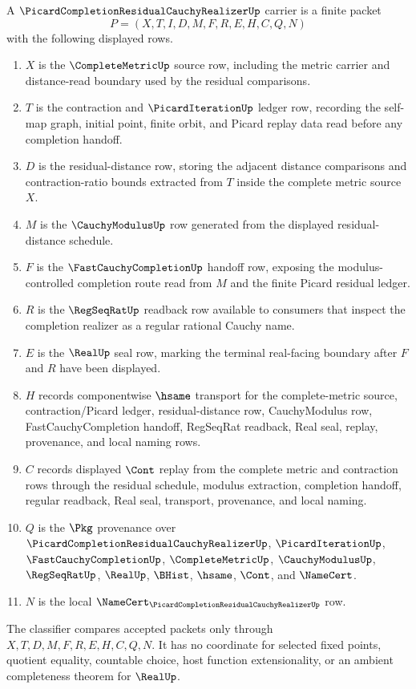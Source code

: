 \begin{definition}
\label{def:picard-completion-residual-cauchy-realizer}
A $\PicardCompletionResidualCauchyRealizerUp$ carrier is a finite packet
$$
P=(X,T,I,D,M,F,R,E,H,C,Q,N)
$$
with the following displayed rows.
\begin{enumerate}
\item $X$ is the $\CompleteMetricUp$ source row, including the metric carrier and distance-read boundary used by the residual comparisons.
\item $T$ is the contraction and $\PicardIterationUp$ ledger row, recording the self-map graph, initial point, finite orbit, and Picard replay data read before any completion handoff.
\item $D$ is the residual-distance row, storing the adjacent distance comparisons and contraction-ratio bounds extracted from $T$ inside the complete metric source $X$.
\item $M$ is the $\CauchyModulusUp$ row generated from the displayed residual-distance schedule.
\item $F$ is the $\FastCauchyCompletionUp$ handoff row, exposing the modulus-controlled completion route read from $M$ and the finite Picard residual ledger.
\item $R$ is the $\RegSeqRatUp$ readback row available to consumers that inspect the completion realizer as a regular rational Cauchy name.
\item $E$ is the $\RealUp$ seal row, marking the terminal real-facing boundary after $F$ and $R$ have been displayed.
\item $H$ records componentwise $\hsame$ transport for the complete-metric source, contraction/Picard ledger, residual-distance row, CauchyModulus row, FastCauchyCompletion handoff, RegSeqRat readback, Real seal, replay, provenance, and local naming rows.
\item $C$ records displayed $\Cont$ replay from the complete metric and contraction rows through the residual schedule, modulus extraction, completion handoff, regular readback, Real seal, transport, provenance, and local naming.
\item $Q$ is the $\Pkg$ provenance over $\PicardCompletionResidualCauchyRealizerUp$, $\PicardIterationUp$, $\FastCauchyCompletionUp$, $\CompleteMetricUp$, $\CauchyModulusUp$, $\RegSeqRatUp$, $\RealUp$, $\BHist$, $\hsame$, $\Cont$, and $\NameCert$.
\item $N$ is the local $\NameCert_{\PicardCompletionResidualCauchyRealizerUp}$ row.
\end{enumerate}
The classifier compares accepted packets only through $X,T,D,M,F,R,E,H,C,Q,N$. It has no coordinate for selected fixed points, quotient equality, countable choice, host function extensionality, or an ambient completeness theorem for $\RealUp$.
\end{definition}

